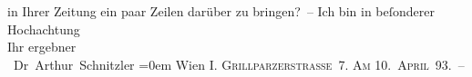 \begin{ledgroupsized}[t]{13cm}
                    in Ihrer Zeitung ein paar Zeilen {\pb}darüber zu
                    bringen? –\pend
           \pstart
           Ich bin in beſonderer Hochachtung{\\[\baselineskip]}Ihr ergebner{\\[\baselineskip]}\spacefill\mbox{ Dr Arthur Schnitzler}\pend
           \leftskip=0em{}\pstart
           \noindent{}Wien I. \textsc{Grillparzerstraße 7}.\pend
           \pstart
           \textsc{Am 10. April 93}. –\pend
           \endnumbering{}\end{ledgroupsized}  \newcommand{\dateiname}{L00196}\newcommand{\titel}{Arthur Schnitzler an Wilhelm Bölsche, 10. 4. 1893}\newcommand{\editorInnen}{Martin Anton Müller und Gerd-Hermann Susen}
      